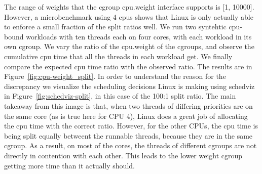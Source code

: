 The range of weights that the cgroup cpu.weight interface supports is [1,
10000]. However, a microbenchmark using 4 cpus shows that Linux is only
actually able to enforce a small fraction of the split ratios well. We run two
syntehtic cpu-bound workloads with ten threads each on four cores, with each
workload in its own cgroup. We vary the ratio of the cpu.weight of the cgroups,
and observe the cumulative cpu time that all the threads in each workload get.
We finally compare the expected cpu time ratio with the observed ratio. The
results are in Figure~\ref{fig:cpu-weight_split}. In order to understand the
reason for the discrepancy we visualize the scheduling decisions Linux is making
using schedviz\cite{schedviz} in Figure~\ref{fig:schedviz-split}, in this case
of the 100:1 split ratio. The main takeaway from this image is that, when two
threads of differing priorities are on the same core (as is true here for CPU
4), Linux does a great job of allocating the cpu time with the correct ratio.
However, for the other CPUs, the cpu time is being split equally betweent the
runnable threads, because they are in the same cgroup. As a result, on most of
the cores, the threads of different cgroups are not directly in contention with
each other. This leads to the lower weight cgroup getting more time than it
actually should.


